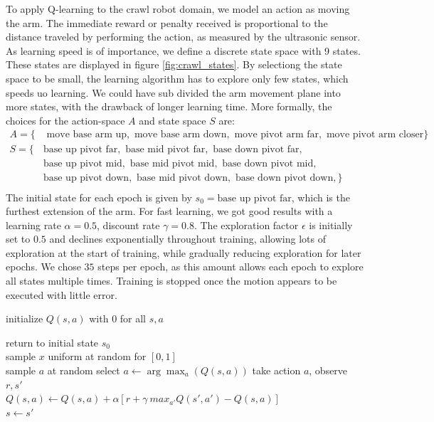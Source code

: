 \documentclass[11pt, a4paper]{article}
\begin{document}
To apply Q-learning to the crawl robot domain, we model an action as moving the arm. The immediate reward or penalty received is proportional to the distance traveled by performing the action, as measured by the ultrasonic sensor. As learning speed is of importance, we define a discrete state space with 9 states. These states are displayed in figure \ref{fig:crawl_states}. By selectiong the state space to be small, the learning algorithm has to explore only few states, which speeds uo learning. We could have sub divided the arm movement plane into more states, with the drawback of longer learning time. More formally, the choices for the action-space $A$ and state space $S$ are:
\begin{align*}
	A = \{ &\text{ move base arm up}, \text{ move base arm down} , \text{ move pivot arm far}, \text{ move pivot arm closer}\} \\
	S = \{ &\text{base up pivot far}, \text{ base mid pivot far}, \text{ base down pivot far}, \\
	       &\text{base up pivot mid}, \text{ base mid pivot mid}, \text{ base down pivot mid},\\
	       &\text{base up pivot down}, \text{ base mid pivot down}, \text{ base down pivot down},\} \\
\end{align*}
The initial state for each epoch is given by $s_0 = \text{base up pivot far}$, which is the furthest extension of the arm. For fast learning, we got good results with a learning rate $\alpha = 0.5$, discount rate $\gamma = 0.8$. The exploration factor $\epsilon$ is initially set to $0.5$ and declines exponentially throughout training, allowing lots of exploration at the start of training, while gradually reducing exploration for later epochs. We chose $35$ steps per epoch, as this amount allows each epoch to explore all states multiple times. Training is stopped once the motion appears to be executed with little error.

\begin{algorithm}[]
	
	\Input{learning rate $\alpha \in ]0,1]$, discount rate $\gamma \in [0,1[$}
	initialize $Q(s, a)$ with $0$ for all $s,a$\\
	{
		return to initial state $s_0$ \\
		{
			sample $x$ uniform at random for $[0,1]$ \\
			{sample $a$ at random}
			{select $a \leftarrow \arg \max_a(Q(s,a))$}	
			take action $a$, observe $r, s'$ \\
			$Q(s,a) \leftarrow Q(s,a) + \alpha [r + \gamma \  max_{a'} Q(s', a') - Q(s,a)]$ \\
			$s \leftarrow s'$
		}
		
	}
	\caption{Q-learning with $\epsilon$-greedy exploration}
	\label{alg:q-learn}
\end{algorithm}
\end{document}
